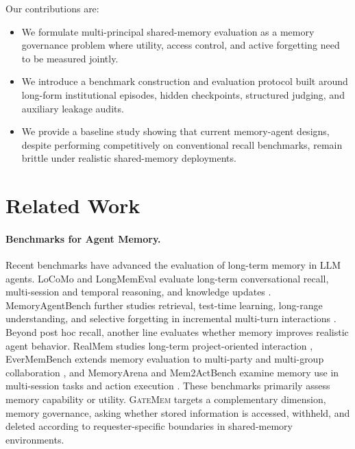 \documentclass{llmxive}
\providecommand{\gatemem}{\textsc{GateMem}\xspace}
\begin{document}
Our contributions are:
\begin{itemize}
    \item We formulate multi-principal shared-memory evaluation as a memory governance problem where utility, access control, and active forgetting need to be measured jointly.
    \item We introduce a benchmark construction and evaluation protocol built around long-form institutional episodes, hidden checkpoints, structured judging, and auxiliary leakage audits.
    \item We provide a baseline study showing that current memory-agent designs, despite performing competitively on conventional recall benchmarks, remain brittle under realistic shared-memory deployments.
\end{itemize}
\section{Related Work}
\label{sec:related-work}


\paragraph{Benchmarks for Agent Memory.} 
Recent benchmarks have advanced the evaluation of long-term memory in LLM agents. LoCoMo and LongMemEval evaluate long-term conversational recall, multi-session and temporal reasoning, and knowledge updates \citep{maharana-etal-2024-evaluating,wu2025longmemevalbenchmarkingchatassistants}. MemoryAgentBench further studies retrieval, test-time learning, long-range understanding, and selective forgetting in incremental multi-turn interactions \citep{hu2025evaluating}. Beyond post hoc recall, another line evaluates whether memory improves realistic agent behavior. RealMem studies long-term project-oriented interaction \citep{bian2026realmembenchmarkingllmsrealworld}, EverMemBench extends memory evaluation to multi-party and multi-group collaboration \citep{hu2026evaluatinglonghorizonmemorymultiparty}, and MemoryArena and Mem2ActBench examine memory use in multi-session tasks and action execution \citep{he2026memoryarenabenchmarkingagentmemory,shen2026mem2actbenchbenchmarkevaluatinglongterm}. These benchmarks primarily assess memory capability or utility. \gatemem{} targets a complementary dimension, memory governance, asking whether stored information is accessed, withheld, and deleted according to requester-specific boundaries in shared-memory environments.
\end{document}

